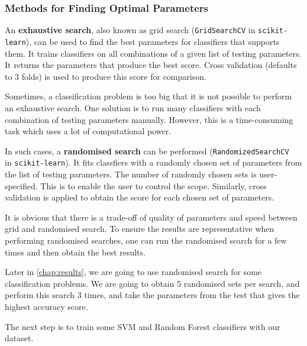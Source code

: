 \subsubsection{Methods for Finding Optimal Parameters}
An \textbf{exhaustive search}, also known as grid search (\texttt{GridSearchCV} in \texttt{scikit-learn}), can be used to find the best parameters for classifiers that supports them. It trains classifiers on all combinations of a given list of testing parameters. It returns the parameters that produce the best score. Cross validation (defaults to 3 folds) is used to produce this score for comparison. 

Sometimes, a classification problem is too big that it is not possible to perform an exhaustive search. One solution is to run many classifiers with each combination of testing parameters manually. However, this is a time-consuming task which uses a lot of computational power. 

In such cases, a \textbf{randomised search} can be performed (\texttt{RandomizedSearchCV} \\in \texttt{scikit-learn}). It fits classfiers with a randomly chosen set of parameters from the list of testing parameters. The number of randomly chosen sets is user-specified. This is to enable the user to control the scope. Similarly, cross validation is applied to obtain the score for each chosen set of parameters.

It is obvious that there is a trade-off of quality of parameters and speed between grid and randomised search. To ensure the results are representative when performing randomised searches, one can run the randomised search for a few times and then obtain the best results.

Later in \autoref{chap:results}, we are going to use randomised search for some classification problems. We are going to obtain 5 randomised sets per search, and perform this search 3 times, and take the parameters from the test that gives the highest accuracy score.


The next step is to train some SVM and Random Forest classifiers with our dataset. 
